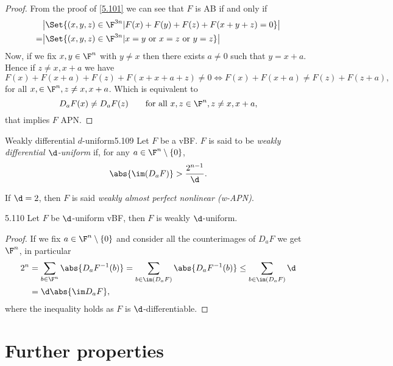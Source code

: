 \begin{proof}
	From the proof of \autoref{5.101} we can see that \(F\) is AB if and only if
	\begin{align*}
		  & \big\lvert\Set{(x,y,z) \in \F^{3n} | F(x)+F(y)+F(z)+F(x+y+z) = 0}\big\rvert        \\
		= & \big\lvert\Set{(x,y,z)\in\F^{3n} | x = y \text{ or }x=z \text{ or }y=z}\big\rvert
	\end{align*}
	Now, if we fix \(x,y\in\F^n\) with \(y\neq x\) then there exists \(a\neq 0\) such that \(y=x+a\). Hence if \(z\neq x,x+a\) we have
	\[
		F(x)+F(x+a)+F(z)+F(x+x+a+z) \neq 0 \iff F(x)+F(x+a) \neq F(z)+F(z+a),
	\]
	for all \(x,\in\F^n,z\neq x,x+a\). Which is equivalent to
	\[
		D_a F(x) \neq D_aF(z) \qquad\text{for all }x,z\in\F^n, z\neq x,x+a,
	\]
	that implies \(F\) APN.
\end{proof}

\begin{defn}{Weakly differential \(d\)-uniform}{5.109}
	Let \(F\) be a vBF. \(F\) is said to be \emph{weakly differential \(\d\)-uniform} if, for any \(a\in \F^n\setminus\{0\}\),
	\[
		\abs{\im(D_a F)} > \frac{2^{n-1}}{\d}.
	\]
\end{defn}

\begin{notz}
	If \(\d=2\), then \(F\) is said \emph{weakly almost perfect nonlinear (w-APN)}.
\end{notz}

\begin{prop}{}{5.110}
	Let \(F\) be \(\d\)-uniform vBF, then \(F\) is weakly \(\d\)-uniform.
\end{prop}

\begin{proof}
	If we fix \(a\in\F^n\setminus\{0\}\) and consider all the counterimages of \(D_a F\) we get \(\F^n\), in particular
	\begin{align*}
		2^n & = \sum_{b\in\F^n}\abs{D_a F^{-1}(b)} = \sum_{b\in\im(D_aF)}\abs{D_aF^{-1}(b)} \le \sum_{b\in\im(D_a F)}\d \\
		    & = \d\abs{\im D_a F},
	\end{align*}
	where the inequality holds as \(F\) is \(\d\)-differentiable.
\end{proof}
%
%
\section{Further properties}

